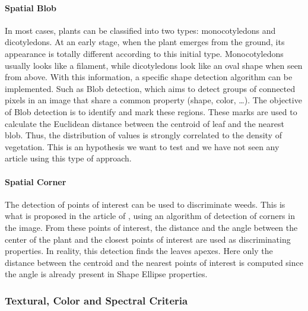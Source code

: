 \documentclass[../thesis.tex]{subfiles}
\begin{document}
    \newpage
    \paragraph{Spatial Blob} In most cases, plants can be classified into two types: monocotyledons and dicotyledons. At an early stage, when the plant emerges from the ground, its appearance is totally different according to this initial type. Monocotyledons usually looks like a filament, while dicotyledons look like an oval shape when seen from above. With this information, a specific shape detection algorithm can be implemented. Such as Blob detection, which aims to detect groups of connected pixels in an image that share a common property (shape, color, \dots). The objective of Blob detection is to identify and mark these regions. These marks are used to calculate the Euclidean distance between the centroid of leaf and the nearest blob. Thus, the distribution of values is strongly correlated to the density of vegetation. This is an hypothesis we want to test and we have not seen any article using this type of approach.
    
    \paragraph{Spatial Corner} The detection of points of interest can be used to discriminate weeds. This is what is proposed in the article of \cite{agronomy10010113}, using an algorithm of detection of corners in the image. From these points of interest, the distance and the angle between the center of the plant and the closest points of interest are used as discriminating properties. In reality, this detection finds the leaves apexes. Here only the distance between the centroid and the nearest points of interest is computed since the angle is already present in Shape Ellipse properties.
    
    
    \subsubsection{Textural, Color and Spectral Criteria}
    
\end{document}
